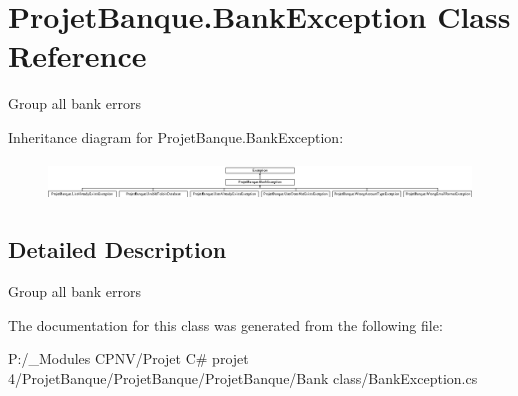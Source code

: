 \hypertarget{class_projet_banque_1_1_bank_exception}{}\section{Projet\+Banque.\+Bank\+Exception Class Reference}
\label{class_projet_banque_1_1_bank_exception}


Group all bank errors  


Inheritance diagram for Projet\+Banque.\+Bank\+Exception\+:\begin{figure}[H]
\begin{center}
\leavevmode
\includegraphics[height=1.052631cm]{class_projet_banque_1_1_bank_exception}
\end{center}
\end{figure}


\subsection{Detailed Description}
Group all bank errors 



The documentation for this class was generated from the following file\+:\begin{DoxyCompactItemize}
\item 
P\+:/\+\_\+\+Modules C\+P\+N\+V/\+Projet C\# projet 4/\+Projet\+Banque/\+Projet\+Banque/\+Projet\+Banque/\+Bank class/Bank\+Exception.\+cs\end{DoxyCompactItemize}
